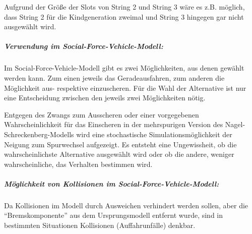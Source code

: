 Aufgrund der Größe der Slots von String 2 und String 3 wäre es z.B. möglich, dass String 2 für die Kindgeneration zweimal und String 3 hingegen gar nicht ausgewählt wird.


\subparagraph{Verwendung im Social-Force-Vehicle-Modell:}

Im Social-Force-Vehicle-Modell gibt es zwei Möglichkeiten, aus denen gewählt werden kann. 
Zum einen jeweils das Geradeausfahren, zum anderen die Möglichkeit aus- respektive einzuscheren.
Für die Wahl der Alternative ist nur eine Entscheidung zwischen den jeweils zwei Möglichkeiten nötig.

Entgegen des Zwangs zum Ausscheren oder einer vorgegebenen Wahrscheinlichkeit für das Einscheren in der mehrspurigen Version des Nagel-Schreckenberg-Modells wird eine stochastische Simulationsmöglichkeit der Neigung zum Spurwechsel aufgezeigt.
Es entsteht eine Ungewissheit, ob die wahrscheinlichste Alternative ausgewählt wird oder ob die andere, weniger wahrscheinliche, das Verhalten bestimmen wird. 

\subparagraph{Möglichkeit von Kollisionen im Social-Force-Vehicle-Modell:}

Da Kollisionen im Modell durch Ausweichen verhindert werden sollen, aber die \enquote{Bremskomponente} aus dem Ursprungsmodell entfernt wurde, sind in bestimmten Situationen Kollisionen (Auffahrunfälle) denkbar.

